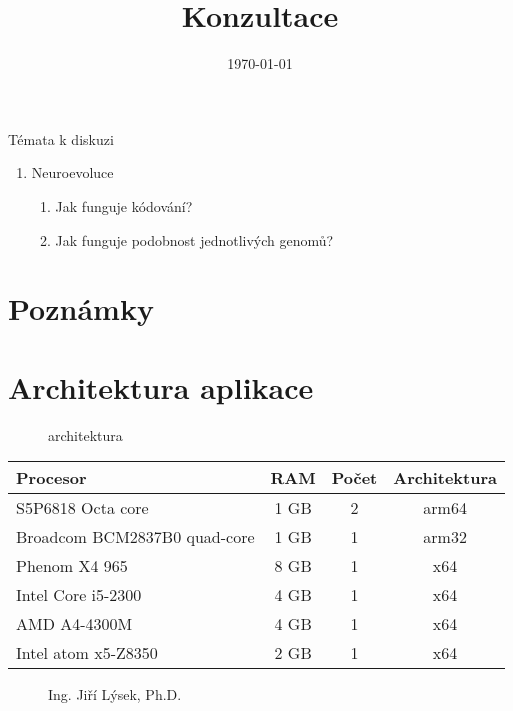 \documentclass[a4paper,11pt,twoside]{article}
\title{Konzultace}
\date{\today}
\begin{document}
	\maketitle
	Témata k diskuzi
	\begin{enumerate}
		\item Neuroevoluce
			\begin{enumerate}
				\item Jak funguje kódování?
				\item Jak funguje podobnost jednotlivých genomů?
			\end{enumerate}
	\end{enumerate}
	
	\newpage
	\section{Poznámky}

	\newpage
	\section{Architektura aplikace}
	\begin{figure}[h!]
		\centering
		\caption{architektura}
	\end{figure}
	\begin{tabular}{|l|c|c|c|}
		\hline 
		Procesor & RAM & Počet & Architektura\\ 
		\hline 
		S5P6818 Octa core & 1 GB & 2 & arm64 \\ 
		\hline 
		Broadcom BCM2837B0 quad-core & 1 GB & 1 & arm32 \\ 
		\hline 
		Phenom X4 965 & 8 GB & 1 & x64 \\ 
		\hline
		Intel Core i5-2300 & 4 GB & 1 & x64 \\ 
		\hline
		AMD A4-4300M & 4 GB & 1 & x64 \\ 
		\hline 
		Intel atom x5-Z8350 & 2 GB & 1 & x64 \\ 
		\hline
	\end{tabular} 

	\begin{figure}[!b]
		\flushright
		Ing. Jiří Lýsek, Ph.D.\hspace{0.5cm} \makebox[1.5in]{\hrulefill}
	\end{figure}
\end{document}
